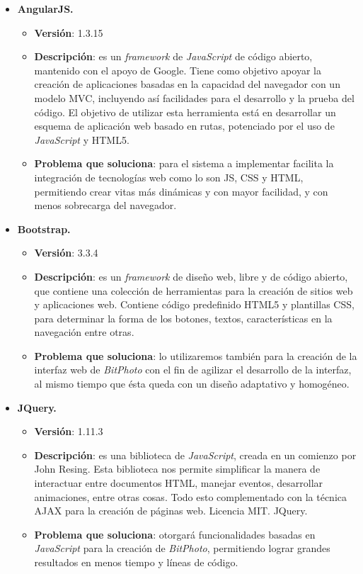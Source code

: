 \documentclass{memoria}
\begin{document}
\begin{itemize}
\item \textbf{AngularJS.}
	\begin{itemize}
	\item \textbf{Versión}: 1.3.15 
	\item \textbf{Descripción}: es un \textsl{framework} de \textsl{JavaScript} de código abierto, mantenido con el apoyo de Google. Tiene como objetivo apoyar la creación de aplicaciones basadas en la capacidad del navegador con un modelo MVC, incluyendo así facilidades para el desarrollo y la prueba del código. El objetivo de utilizar esta herramienta está en desarrollar un esquema de aplicación web basado en rutas, potenciado por el uso de \textsl{JavaScript} y HTML5.
	\item \textbf{Problema que soluciona}: para el sistema a implementar facilita la integración de tecnologías web como lo son JS, CSS y HTML, permitiendo crear vitas más dinámicas y con mayor facilidad, y con menos sobrecarga del navegador.
	\end{itemize}
	
\item \textbf{Bootstrap.}
	\begin{itemize}
	\item \textbf{Versión}: 3.3.4 
	\item \textbf{Descripción}: es un \textsl{framework} de diseño web, libre y de código abierto, que contiene una colección de herramientas para la creación de sitios web y aplicaciones web. Contiene código predefinido HTML5 y plantillas CSS, para determinar la forma de los botones, textos, características en la navegación entre otras.
	\item \textbf{Problema que soluciona}: lo utilizaremos también para la creación de la interfaz web de \textsl{BitPhoto} con el fin de agilizar el desarrollo de la interfaz, al mismo tiempo que ésta queda con un diseño adaptativo y homogéneo.  
	\end{itemize}
	
\item \textbf{JQuery.}
	\begin{itemize}
	\item \textbf{Versión}: 1.11.3 
	\item \textbf{Descripción}: es una biblioteca de \textsl{JavaScript}, creada en un comienzo por John Resing. Esta biblioteca nos permite simplificar la manera de interactuar entre documentos HTML, manejar eventos, desarrollar animaciones, entre otras cosas. Todo esto complementado con la técnica AJAX para la creación de páginas web. Licencia MIT. JQuery.
	\item \textbf{Problema que soluciona}: otorgará funcionalidades basadas en \textsl{JavaScript} para la creación de \textsl{BitPhoto}, permitiendo lograr grandes resultados en menos tiempo y líneas de código.  
	\end{itemize}
	

\end{itemize}
\end{document}
